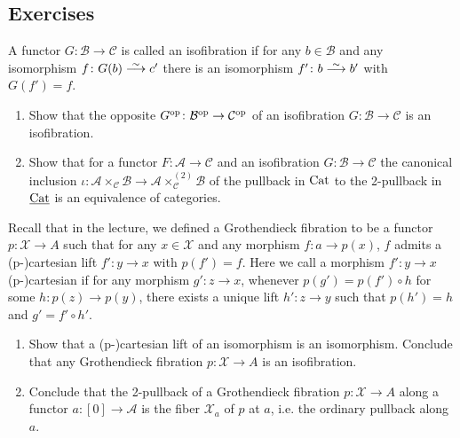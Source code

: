 \subsection{Exercises}

\begin{Exercise}
	A functor $ G \colon \mathcal{ B } \to \mathcal{ C } $ is called an isofibration if for any $ b \in \mathcal{ B } $ and any isomorphism $ f \colon G ( b ) \isomorphism c' $ there is an isomorphism $ f' \colon b \isomorphism b'$ with $ G ( f' ) = f $.
	
	\begin{enumerate}[label=(\alph*)]
		\item 
		Show that the opposite $ G^{ \operatorname{op} } \colon  \mathcal{ B }^{ \operatorname{op} } \to \mathcal{ C }^{ \operatorname{op} } $ of an isofibration $ G \colon \mathcal{ B } \to \mathcal{ C } $ is an isofibration.
		
		\item 
		Show that for a functor $ F \colon \mathcal{ A } \to \mathcal{ C } $ and an isofibration $ G \colon \mathcal{ B } \to \mathcal{ C } $
		the canonical inclusion $ \iota \colon \mathcal{ A } \times_ { \mathcal{ C } } \mathcal{ B } \to \mathcal{ A } \times^{ ( 2 ) }_{ \mathcal{ C } } \mathcal{ B } $ of the pullback in $ \operatorname{Cat} $ to the 2-pullback in $ \underline{ \operatorname{Cat} } $ is an equivalence of categories.
	\end{enumerate}
	
	Recall that in the lecture, we defined a Grothendieck fibration to be a functor $ p \colon \mathcal{ X } \to  A $ such that for any $ x \in \mathcal{ X } $ and any morphism $ f \colon a \to p ( x ) $, $ f $ admits a (p-)cartesian lift $ f' \colon y \to x $ with $ p ( f' ) = f $.
	Here we call a morphism $ f' \colon y \to x $ (p-)cartesian if for any morphism $ g' \colon z \to x $, whenever $ p ( g' ) = p ( f' ) \circ h $ for some $ h \colon p ( z ) \to p ( y ) $, there exists a unique lift $ h' \colon z \to y $ such that $ p ( h' ) = h $ and $ g' = f' \circ h' $.
	
	\begin{enumerate}[resume, label=(\alph*)]
		\item 
		Show that a (p-)cartesian lift of an isomorphism is an isomorphism.
		Conclude that any Grothendieck fibration $ p \colon \mathcal{ X } \to A $ is an isofibration.
		
		\item 
		Conclude that the 2-pullback of a Grothendieck fibration $ p \colon \mathcal{ X } \to  A $ along a functor $ a \colon [ 0 ] \to \mathcal{ A } $ is the fiber $ \mathcal{ X }_a $ of $ p $ at $ a $, i.e. the ordinary pullback along $ a $.
	\end{enumerate}
\end{Exercise}

